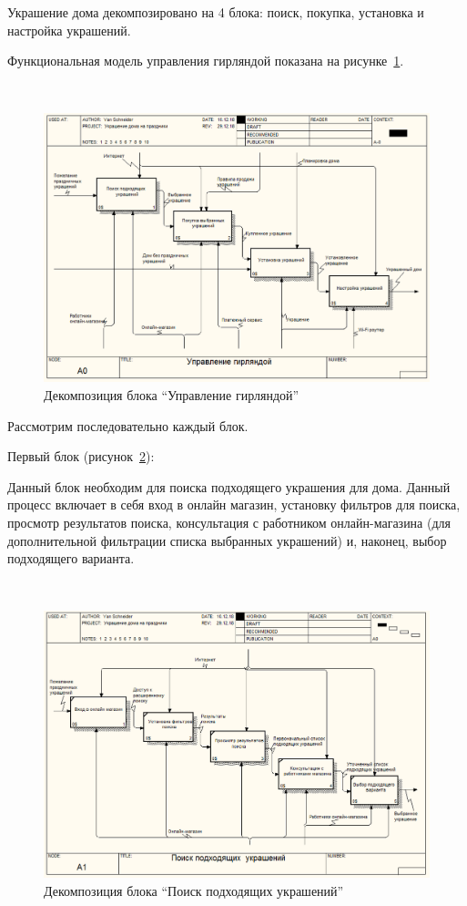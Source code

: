 Украшение дома декомпозировано на 4 блока: поиск, покупка, установка и настройка украшений.

Функциональная модель управления гирляндой показана на рисунке~\ref{fig:analysis:functionalModel:a0_decoration}.

~
\begin{figure}[H]
\centering
	\includegraphics[scale=0.45]{figures/functionalModel/a0_decoration.jpg}
	\caption{Декомпозиция блока ``Управление гирляндой''}
	\label{fig:analysis:functionalModel:a0_decoration}
\end{figure}

Рассмотрим последовательно каждый блок.

Первый блок (рисунок~\ref{fig:analysis:functionalModel:a1_search}):

Данный блок необходим для поиска подходящего украшения для дома. Данный процесс включает в себя вход в онлайн магазин, установку фильтров для поиска, просмотр результатов поиска, консультация с работником онлайн-магазина (для дополнительной фильтрации списка выбранных украшений) и, наконец, выбор подходящего варианта.

 ~
\begin{figure}[H]
\centering
	\includegraphics[scale=0.45]{figures/functionalModel/a1_search.jpg}
	\caption{Декомпозиция блока ``Поиск подходящих украшений''}
	\label{fig:analysis:functionalModel:a1_search}
\end{figure}

